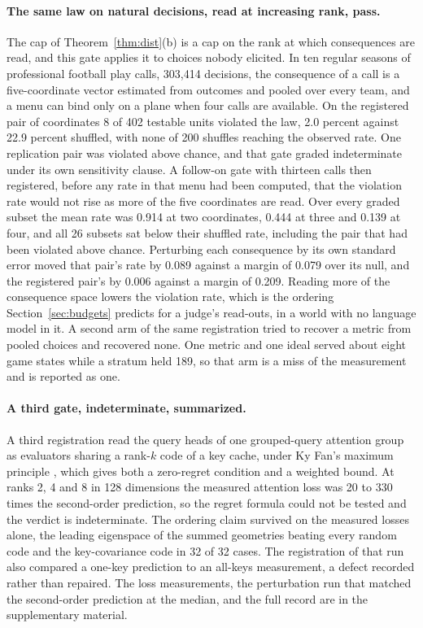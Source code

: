 \documentclass{article}
\theoremstyle{definition}
\theoremstyle{remark}
\begin{document}
\paragraph{The same law on natural decisions, read at increasing rank, pass.}
The cap of Theorem~\ref{thm:dist}(b) is a cap on the rank at which consequences are read, and this gate applies it to choices nobody elicited.
In ten regular seasons of professional football play calls, 303{,}414 decisions, the consequence of a call is a five-coordinate vector estimated from outcomes and pooled over every team, and a menu can bind only on a plane when four calls are available.
On the registered pair of coordinates 8 of 402 testable units violated the law, 2.0 percent against 22.9 percent shuffled, with none of 200 shuffles reaching the observed rate. One replication pair was violated above chance, and that gate graded indeterminate under its own sensitivity clause.
A follow-on gate with thirteen calls then registered, before any rate in that menu had been computed, that the violation rate would not rise as more of the five coordinates are read.
Over every graded subset the mean rate was 0.914 at two coordinates, 0.444 at three and 0.139 at four, and all 26 subsets sat below their shuffled rate, including the pair that had been violated above chance.
Perturbing each consequence by its own standard error moved that pair's rate by 0.089 against a margin of 0.079 over its null, and the registered pair's by 0.006 against a margin of 0.209.
Reading more of the consequence space lowers the violation rate, which is the ordering Section~\ref{sec:budgets} predicts for a judge's read-outs, in a world with no language model in it.
A second arm of the same registration tried to recover a metric from pooled choices and recovered none. One metric and one ideal served about eight game states while a stratum held 189, so that arm is a miss of the measurement and is reported as one.

\paragraph{A third gate, indeterminate, summarized.}
A third registration read the query heads of one grouped-query attention group as evaluators sharing a rank-$k$ code of a key cache, under Ky Fan's maximum principle \citep{fan1949}, which gives both a zero-regret condition and a weighted bound.
At ranks 2, 4 and 8 in 128 dimensions the measured attention loss was 20 to 330 times the second-order prediction, so the regret formula could not be tested and the verdict is indeterminate.
The ordering claim survived on the measured losses alone, the leading eigenspace of the summed geometries beating every random code and the key-covariance code in 32 of 32 cases.
The registration of that run also compared a one-key prediction to an all-keys measurement, a defect recorded rather than repaired.
The loss measurements, the perturbation run that matched the second-order prediction at the median, and the full record are in the supplementary material.
\end{document}
